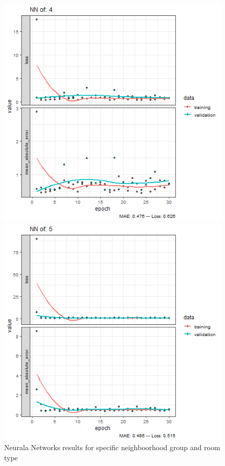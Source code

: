 \documentclass{FR16}
\begin{document}
\begin{figure}[!htb]
\begin{minipage}{0.33\textwidth}
   \end{minipage}\hfill
   \begin{minipage}{0.33\textwidth}
     \centering
     \includegraphics[width=1\linewidth]{figures/NN-4.png}
   \end{minipage}
   \begin{minipage}{0.33\textwidth}
     \centering
     \includegraphics[width=1\linewidth]{figures/NN-5.png}
   \end{minipage}
        \caption{Neurala Networks results for specific neighboorhood group and room type}\label{fig:20}

\end{figure}
\end{document}
